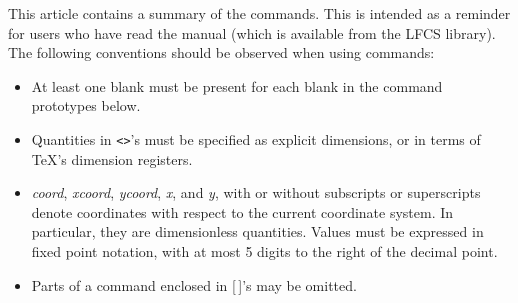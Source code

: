 
\newcommand{\unix}{{\sc unix}}
\newcommand{\dvilaser}{{\sc DviLaser}}
\newcommand{\tex}{{tex}}
\newcommand{\Tex}{{Tex}}

\newcommand{\rvb}{{\symfont\char'152}}

\renewcommand{\emph}[1]{{\em#1\/}}
\newcommand{\slan}[1]{{\sl#1\/}}
\newcommand{\type}[1]{{\tt#1}}

\newenvironment{command}%
  {\begin{list}{}{\tt}\item[]}%
  {\end{list}}
%
  {\begin{list}{}{\itemsep0pt}\item[]}%
  {\end{list}}
%
  {\begin{list}{}{\small{}\itemsep0pt}\item[]}%
  {\end{list}}
\newenvironment{syntax}%
  {\begin{labelled}}%
  {\end{labelled}}

\pagestyle{headings}




\maketitle

This article contains a summary of the \PiCTeX{} commands. This is intended as
a reminder for users who have read the \PiCTeX{} manual (which is available
from the LFCS library). The following conventions should be observed when
using \PiCTeX{} commands:
\begin{itemize}
\item
At least one blank must be present for each blank in the command prototypes
below.
\item
Quantities in \type{<>}'s must be specified as explicit dimensions, or in
terms of \TeX's dimension registers.
\item
\emph{coord}, \emph{xcoord}, \emph{ycoord}, \emph{x}, and \emph{y}, with or
without subscripts or superscripts denote coordinates with respect to the
current coordinate system. In particular, they are dimensionless quantities.
Values must be expressed in fixed point notation, with at most 5 digits to the
right of the decimal point.
\item
Parts of a command enclosed in [\,]'s may be omitted.
\end{itemize}

